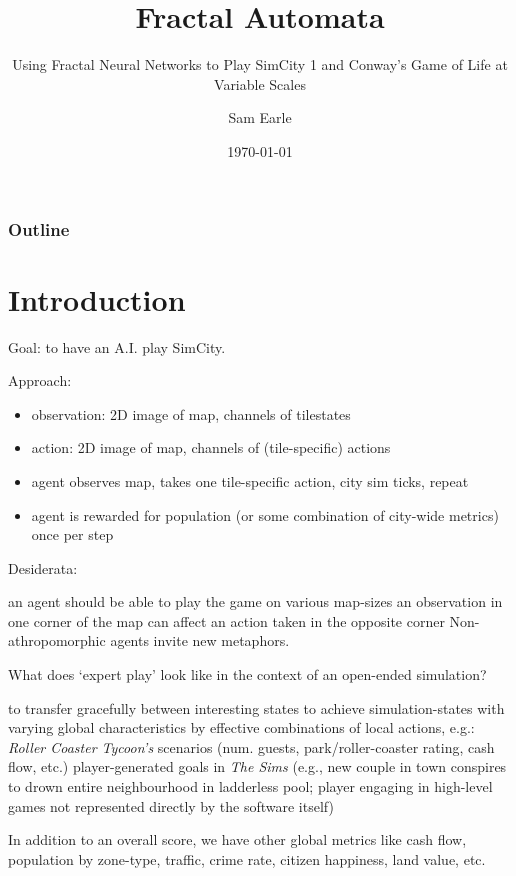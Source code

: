\documentclass[xcolor=dvipsnames]{beamer}
\title{Fractal Automata}
\subtitle{Using Fractal Neural Networks to Play SimCity 1 and Conway's Game of Life at Variable Scales}
\author{Sam Earle}
\date{\today}
\begin{document}
\begin{frame}
\titlepage
\end{frame}

\begin{frame}
\frametitle{Outline}
\tableofcontents
\end{frame}
	\section{Introduction}
\begin{frame}
	Goal: to have an A.I. play SimCity.
\end{frame}
\begin{frame}
	Approach:
	\begin{itemize}
		\item observation: 2D image of map, channels of tilestates
		\item action: 2D image of map, channels of (tile-specific) actions
		\item agent observes map, takes one tile-specific action, city sim ticks, repeat
		\item agent is rewarded for population (or some combination of city-wide metrics) once per step
	\end{itemize}

	Desiderata: 
	\begin{outline}
			\1 an agent should be able to play the game on various map-sizes
			\1 an observation in one corner of the map can affect an action taken in the opposite corner
    Non-athropomorphic agents invite new metaphors.
    \end{outline}
\end{frame}
\begin{frame}
	What does `expert play' look like in the context of an open-ended simulation?
	\begin{outline}
			\1 to transfer gracefully between interesting states
			\1 to achieve simulation-states with varying global characteristics by effective combinations of local actions, e.g.:
			\2 \textit{Roller Coaster Tycoon's} scenarios (num. guests, park/roller-coaster rating, cash flow, etc.)
            \2 player-generated goals in \textit{The Sims} (e.g., new couple in town conspires to drown entire neighbourhood in ladderless pool; player engaging in high-level games not represented directly by the software itself)

	\end{outline}

	In addition to an overall score, we have other global metrics like cash flow, population by zone-type, traffic, crime rate, citizen happiness, land value, etc.
\end{frame}
\end{document}

